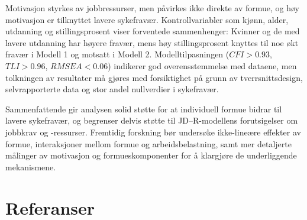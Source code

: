 \documentclass[
  12pt,
  a4paper,
  DIV=11,
  numbers=noendperiod]{scrartcl}
\begin{document}
Motivasjon styrkes av jobbressurser, men påvirkes ikke direkte av
formue, og høy motivasjon er tilknyttet lavere sykefravær.
Kontrollvariabler som kjønn, alder, utdanning og stillingsprosent viser
forventede sammenhenger: Kvinner og de med lavere utdanning har høyere
fravær, mens høy stillingsprosent knyttes til noe økt fravær i Modell 1
og motsatt i Modell 2. Modelltilpasningen (\(CFI>0.93\), \(TLI>0.96\),
\(RMSEA<0.06\)) indikerer god overensstemmelse med dataene, men
tolkningen av resultater må gjøres med forsiktighet på grunn av
tverrsnittsdesign, selvrapporterte data og stor andel nullverdier i
sykefravær.

Sammenfattende gir analysen solid støtte for at individuell formue
bidrar til lavere sykefravær, og begrenser delvis støtte til
JD--R-modellens forutsigelser om jobbkrav og -ressurser. Fremtidig
forskning bør undersøke ikke-lineære effekter av formue, interaksjoner
mellom formue og arbeidsbelastning, samt mer detaljerte målinger av
motivasjon og formueskomponenter for å klargjøre de underliggende
mekanismene.

\newpage

\section*{Referanser}\label{referanser}
\end{document}
